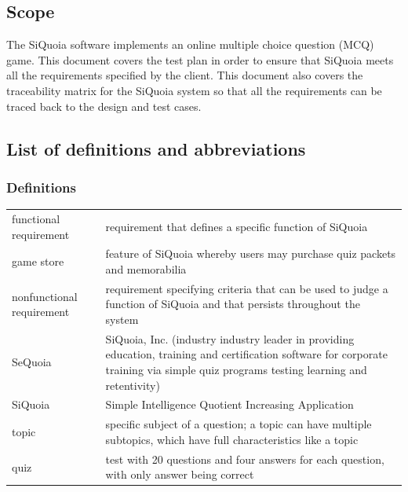 \documentclass[12pt]{article}
\begin{document}
\subsection{Scope}
The SiQuoia software implements an online multiple choice question
(MCQ) game. This document covers the test plan in order to ensure that
SiQuoia meets all the requirements specified by the client. This
document also covers the traceability matrix for the SiQuoia system so
that all the requirements can be traced back to the design and test
cases.

\subsection{List of definitions and abbreviations}

\subsubsection{Definitions}
\begin{center}
\begin{tabular}{p{5cm}p{12cm}}
functional requirement      & requirement that defines a specific 
                              function of SiQuoia \\[2em]
game store                  & feature of SiQuoia whereby users may 
                              purchase quiz packets and memorabilia \\[2em]
nonfunctional requirement   & requirement specifying criteria that can
                              be used to judge a function of SiQuoia
                              and that persists throughout the system \\[2em]
SeQuoia                     & SiQuoia, Inc. (industry industry leader 
                              in providing education, training and 
                              certification software for corporate 
                              training via simple quiz programs 
                              testing learning and retentivity) \\[2em]
SiQuoia                     & Simple Intelligence Quotient Increasing
                              Application \\[2em]
topic                       & specific subject of a question; a topic
                              can have multiple subtopics, which have
                              full characteristics like a topic \\[2em]
quiz                        & test with 20 questions and four answers
                              for each question, with only answer being
                              correct
\end{tabular}
\end{center}
\end{document}
